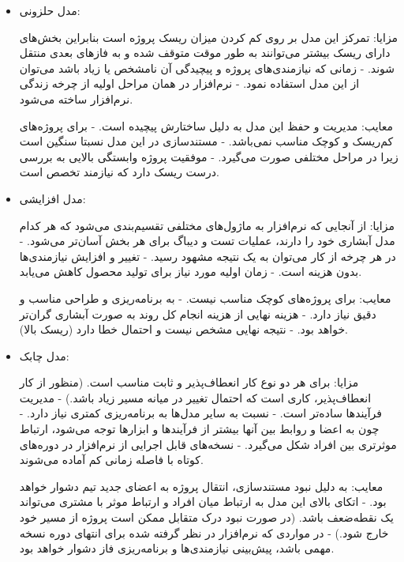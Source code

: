 {\begin{itemize}
معایب: از آنجایی که در هر لحظه امکان تغییر نیازمندی‌ها وجود دارد و مدل بسیار انعطاف‌پذیر است، ممکن است نتیجه نهایی بسیار پیچیده‌تر و در معیار گسترده‌تری نسبت به طراحی اولیه باشد. - هزینه صرف شده برای ساخت نمونه در نهایت تلف‌شده محسوب می‌شود چرا که از نمونه‌ها استفاده‌ای نمی‌شود و کنار گذاشته می‌شوند. - مستندسازی در این مدل به دلیل تغییر زیاد در نیازمندی‌ها ضعیف خواهد بود. 

\item مدل حلزونی:

مزایا: تمرکز این مدل بر روی کم کردن میزان ریسک پروژه است بنابراین بخش‌های دارای ریسک بیشتر می‌توانند به طور موقت متوقف شده و به فازهای بعدی منتقل شوند. - زمانی که نیازمندی‌های پروژه و پیچیدگی آن نامشخص یا زیاد باشد می‌توان از این مدل استفاده نمود. - نرم‌افزار در همان مراحل اولیه از چرخه زندگی نرم‌افزار  ساخته‌ می‌شود.

معایب: مدیریت و حفظ این مدل به دلیل ساختارش پیچیده است. - برای پروژه‌های کم‌ریسک و کوچک مناسب نمی‌باشد. - مستندسازی در این مدل نسبتا سنگین است زیرا در مراحل مختلفی صورت می‌گیرد. - موفقیت پروژه وابستگی بالایی به بررسی درست ریسک  دارد که نیازمند تخصص است.

\item مدل افزایشی:

مزایا: از آنجایی که نرم‌افزار به ماژول‌های مختلفی تقسیم‌بندی می‌شود که هر کدام مدل آبشاری خود را دارند، عملیات تست و دیباگ برای هر بخش آسان‌تر می‌شود. - در هر چرخه از کار می‌توان به یک نتیجه مشهود رسید. - تغییر و افزایش نیازمندی‌ها بدون هزینه است. -  زمان اولیه مورد نیاز برای تولید محصول کاهش می‌یابد. 

معایب: برای پروژه‌های کوچک مناسب نیست. - به برنامه‌ریزی و طراحی مناسب و دقیق نیاز دارد. - هزینه نهایی از هزینه انجام کل روند به صورت آبشاری گران‌تر خواهد بود. - نتیجه نهایی مشخص نیست و احتمال خطا دارد (ریسک بالا).

\item مدل چابک:

مزایا: برای هر دو نوع کار انعطاف‌پذیر و ثابت مناسب است. (منظور از کار انعطاف‌پذیر، کاری است که احتمال تغییر در میانه مسیر زیاد باشد.) - مدیریت فرآیندها ساده‌تر است. - نسبت به سایر مدل‌ها به برنامه‌ریزی کمتری نیاز دارد. - چون به اعضا و روابط بین آنها بیشتر از فرآیند‌ها و ابزارها توجه می‌شود، ارتباط موثرتری بین افراد شکل می‌گیرد. - نسخه‌های قابل اجرایی از نرم‌افزار در دوره‌های کوتاه با فاصله زمانی کم آماده می‌شوند. 

معایب: به دلیل نبود مستند‌سازی، انتقال پروژه به اعضای جدید تیم دشوار خواهد بود. - اتکای بالای این مدل به ارتباط میان افراد و ارتباط موثر با مشتری می‌تواند یک نقطه‌ضعف باشد. (در صورت نبود درک متقابل ممکن است پروژه از مسیر خود خارج شود.) - در مواردی که نرم‌افزار در نظر گرفته شده برای انتهای دوره نسخه مهمی باشد، پیش‌بینی نیازمندی‌ها و برنامه‌ریزی فاز دشوار خواهد بود.  
 

\end{itemize}}
